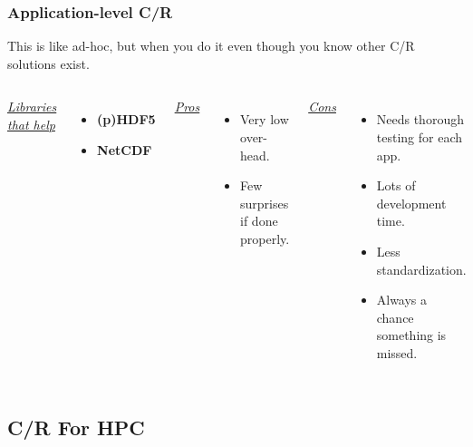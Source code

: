 \documentclass[compress]{beamer}
\begin{document}
\begin{frame}
\frametitle{Application-level C/R}

This is like ad-hoc, but when you do it even though you know
other C/R solutions exist.
\begin{columns}[t]
\ul{\textit{Libraries that help}}
\begin{itemize}
\item \textbf{(p)HDF5}
\item \textbf{NetCDF}
\end{itemize}

\ul{\textit{Pros}}
\begin{itemize}
\item Very low over-head.
\item Few surprises if done properly.
\end{itemize}

\ul{\textit{Cons}}
\begin{itemize}
\item Needs thorough testing for each app.
\item Lots of development time.
\item Less standardization.
\item Always a chance something is missed.
\end{itemize}

\end{columns}


\end{frame}



\subsection{C/R For HPC}      %

\end{document}
